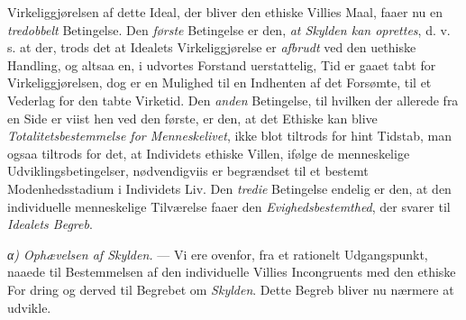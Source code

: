 Virkeliggjørelsen af dette Ideal, der bliver den ethiske Villies Maal, faaer nu
en \emph{tredobbelt} Betingelse. Den \emph{første} Betingelse er den, \emph{at
Skylden kan oprettes}, d. v. s. at der, trods det at Idealets Virkeliggjørelse er
\emph{afbrudt} ved den uethiske Handling, og altsaa en, i udvortes Forstand
uerstattelig, Tid er gaaet tabt for Virkeliggjørelsen, dog er en Mulighed til en
Indhenten af det Forsømte, til et Vederlag for den tabte Virketid. Den
\emph{anden} Betingelse, til hvilken der allerede fra en Side er viist hen ved
den første, er den, at det Ethiske kan blive \emph{Totalitetsbestemmelse for
Menneskelivet}, ikke blot tiltrods for hint Tidstab, man ogsaa tiltrods for det,
at Individets ethiske Villen, ifølge de menneskelige Udviklingsbetingelser,
nødvendigviis er begrændset til et bestemt Modenhedsstadium i Individets Liv. Den
\emph{tredie} Betingelse endelig er den, at den individuelle menneskelige
Tilværelse faaer den \emph{Evighedsbestemthed}, der svarer til \emph{Idealets
Begreb}.

\emph{α) Ophævelsen af Skylden.} --- Vi ere ovenfor, fra et rationelt
Udgangspunkt, naaede til Bestemmelsen af den individuelle Villies Incongruents
med den ethiske For\-%
dring og derved til Begrebet om \emph{Skylden}. Dette Begreb bliver nu nærmere at
udvikle.

